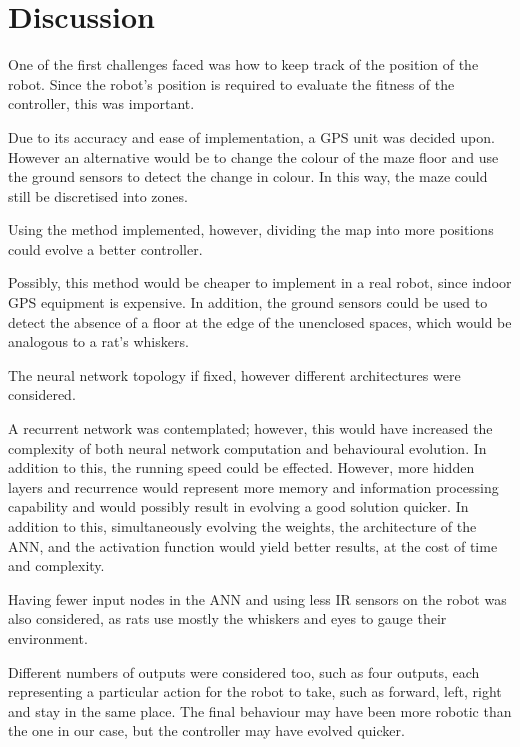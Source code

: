 \section{Discussion} %

One of the first challenges faced was how to keep track of the position of the robot. Since the robot's position is required to evaluate the fitness of the controller, this was important. 

Due to its accuracy and ease of implementation, a GPS unit was decided upon. However an alternative would be to change the colour of the maze floor and use the ground sensors to detect the change in colour. In this way, the maze could still be discretised into zones. 

Using the method implemented, however, dividing the map into more positions could evolve a better controller.

Possibly, this method would be cheaper to implement in a real robot, since indoor GPS equipment is expensive. In addition, the ground sensors could be used to detect the absence of a floor at the edge of the unenclosed spaces, which would be analogous to a rat's whiskers. 

The neural network topology if fixed, however different architectures were considered.

A recurrent network was contemplated; however, this would have increased the complexity of both neural network computation and behavioural evolution. In addition to this, the running speed could be effected. However, more hidden layers and recurrence would represent more memory and information processing capability and would possibly result in evolving a good solution quicker. In addition to this, simultaneously evolving the weights, the architecture of the ANN, and the activation function would yield better results, at the cost of time and complexity.
 
Having fewer input nodes in the ANN and using less IR sensors on the robot was also considered, as rats use mostly the whiskers and eyes to gauge their environment.

Different numbers of outputs were considered too, such as four outputs, each representing a particular action for the robot to take, such as forward, left, right and stay in the same place. The final behaviour may have been more robotic than the one in our case, but the controller may have evolved quicker. 

